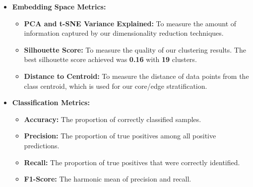 \documentclass{article}
\begin{document}
\begin{itemize}
    \item \textbf{Embedding Space Metrics:}
    \begin{itemize}
        \item \textbf{PCA and t-SNE Variance Explained:} To measure the amount of information captured by our dimensionality reduction techniques.
        \item \textbf{Silhouette Score:} To measure the quality of our clustering results. The best silhouette score achieved was \textbf{0.16} with \textbf{19} clusters.
        \item \textbf{Distance to Centroid:} To measure the distance of data points from the class centroid, which is used for our core/edge stratification.
    \end{itemize}
    \item \textbf{Classification Metrics:}
    \begin{itemize}
        \item \textbf{Accuracy:} The proportion of correctly classified samples.
        \item \textbf{Precision:} The proportion of true positives among all positive predictions.
        \item \textbf{Recall:} The proportion of true positives that were correctly identified.
        \item \textbf{F1-Score:} The harmonic mean of precision and recall.
    \end{itemize}
\end{itemize}
\end{document}

